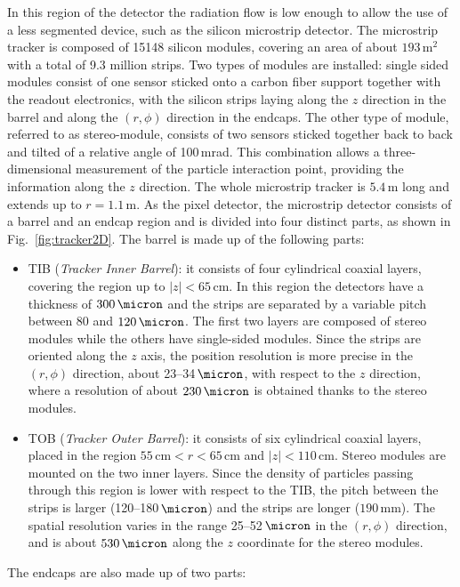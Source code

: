 In this region of the detector the radiation flow is low enough to allow the use of a less segmented device, such as the silicon microstrip detector.
The microstrip tracker is composed of 15148 silicon modules, covering an area of about $193\,\mathrm{m^2}$ with a total of 9.3 million strips. Two types of modules are installed: single sided modules consist of one sensor sticked onto a carbon fiber support together with the readout electronics, with the silicon strips laying along the $z$ direction in the barrel and along the $(r,\phi)$ direction in the endcaps. The other type of module, referred to as stereo-module, consists of two sensors sticked together back to back and tilted of a relative angle of 100\,mrad. This combination allows a three-dimensional measurement of the particle interaction point, providing the information along the $z$ direction. The whole microstrip tracker is $5.4$\,m long and extends up to $r=1.1$\,m. As the pixel detector, the microstrip detector consists of a barrel and an endcap region and is divided into four distinct parts, as shown in Fig.~\ref{fig:tracker2D}. The barrel is made up of the following parts:
\begin{itemize}
\item TIB (\emph{Tracker Inner Barrel}): it consists of four cylindrical coaxial layers, covering the region up to $|z|<65$\,cm. In this region the detectors have a thickness of $300\,\micron$ and the strips are separated by a variable pitch between 80 and $120\,\micron$. The first two layers are composed of stereo modules while the others have single-sided modules. Since the strips are oriented along the $z$ axis, the position resolution is more precise in the $(r,\phi)$ direction, about 23--34$\,\micron$, with respect to the $z$ direction, where a resolution of about $230\,\micron$ is obtained thanks to the stereo modules.
\item TOB (\emph{Tracker Outer Barrel}): it consists of six cylindrical coaxial layers, placed in the region $55\,\mathrm{cm} < r < 65\,\mathrm{cm}$ and $|z|<110$\,cm. Stereo modules are mounted on the two inner layers. Since the density of particles passing through this region is lower with respect to the TIB, the pitch between the strips is larger (120--180$\,\micron$) and the strips are longer ($190$\,mm). The spatial resolution varies in the range 25--52$\,\micron$ in the $(r,\phi)$ direction, and is about $530\,\micron$ along the $z$ coordinate for the stereo modules.
\end{itemize}
The endcaps are also made up of two parts:
